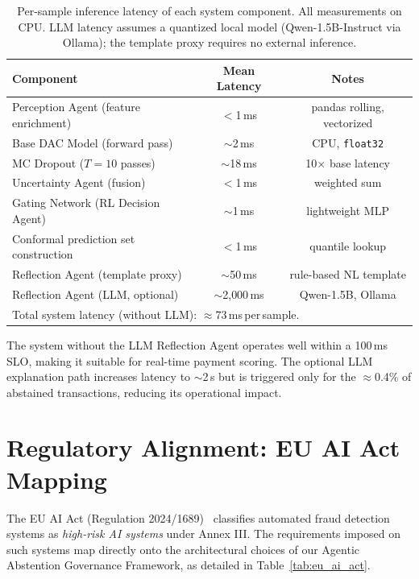 \documentclass[12pt,a4paper]{article}
\begin{document}
\begin{table}[htbp]
  \centering
  \caption{Per-sample inference latency of each system component. All measurements
    on CPU. LLM latency assumes a quantized local model (Qwen-1.5B-Instruct via
    Ollama); the template proxy requires no external inference.}
  \label{tab:latency}
  \begin{tabular}{lcc}
    \toprule
    \textbf{Component} & \textbf{Mean Latency} & \textbf{Notes} \\
    \midrule
    Perception Agent (feature enrichment) & $<$1\,ms & pandas rolling, vectorized \\
    Base DAC Model (forward pass)         & $\sim$2\,ms & CPU, \texttt{float32} \\
    MC Dropout ($T{=}10$ passes)          & $\sim$18\,ms & 10$\times$ base latency \\
    Uncertainty Agent (fusion)            & $<$1\,ms & weighted sum \\
    Gating Network (RL Decision Agent)    & $\sim$1\,ms & lightweight MLP \\
    Conformal prediction set construction & $<$1\,ms & quantile lookup \\
    Reflection Agent (template proxy)     & $\sim$50\,ms & rule-based NL template \\
    Reflection Agent (LLM, optional)      & $\sim$2{,}000\,ms & Qwen-1.5B, Ollama \\
    \bottomrule
    \multicolumn{3}{l}{\small Total system latency (without LLM): $\approx$73\,ms\,per\,sample.} \\
  \end{tabular}
\end{table}

The system without the LLM Reflection Agent operates well within a 100\,ms
SLO, making it suitable for real-time payment scoring. The optional LLM
explanation path increases latency to $\sim$2\,s but is triggered only for the
$\approx$0.4\% of abstained transactions, reducing its operational impact.

\section{Regulatory Alignment: EU AI Act Mapping}
\label{sec:regulatory}

The EU AI Act (Regulation 2024/1689)~\cite{b37} classifies automated fraud
detection systems as \textit{high-risk AI systems} under Annex III. The
requirements imposed on such systems map directly onto the architectural
choices of our Agentic Abstention Governance Framework, as detailed in
Table~\ref{tab:eu_ai_act}.
\end{document}
